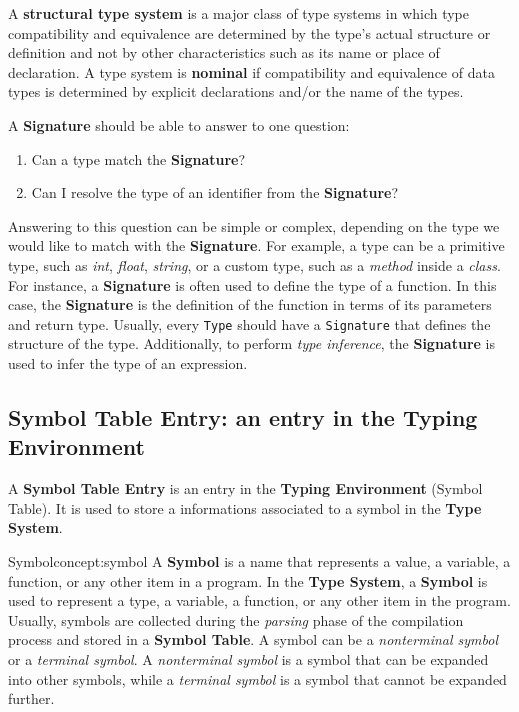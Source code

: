 A \textbf{structural type system} is a major class of type systems in which type compatibility and equivalence are determined by the type's actual structure or definition and not by other characteristics such as its name or place of declaration. A type system is \textbf{nominal} if compatibility and equivalence of data types is determined by explicit declarations and/or the name of the types.

A \textbf{Signature} should be able to answer to one question:

\begin{enumerate}
    \item Can a type match the \textbf{Signature}?
    \item Can I resolve the type of an identifier from the \textbf{Signature}?
\end{enumerate}

Answering to this question can be simple or complex, depending on the type we would like to match with the \textbf{Signature}. For example, a type can be a primitive type, such as \textit{int}, \textit{float}, \textit{string}, or a custom type, such as a \textit{method} inside a \textit{class}.
For instance, a \textbf{Signature} is often used to define the type of a function. In this case, the \textbf{Signature} is the definition of the function in terms of its parameters and return type.
Usually, every \texttt{Type} should have a \texttt{Signature} that defines the structure of the type.
Additionally, to perform \textit{type inference}, the \textbf{Signature} is used to infer the type of an expression.

\subsection{Symbol Table Entry: an entry in the Typing Environment}\label{subsec:concept:SymbolTableEntryAnEntryInTheTypingEnvironment}

A \textbf{Symbol Table Entry} is an entry in the \textbf{Typing Environment} (Symbol Table). It is used to store a informations associated to a symbol in the \textbf{Type System}.

\begin{mydefinition}{Symbol}{concept:symbol}
    A \textbf{Symbol} is a name that represents a value, a variable, a function, or any other item in a program. In the \textbf{Type System}, a \textbf{Symbol} is used to represent a type, a variable, a function, or any other item in the program.
    Usually, symbols are collected during the \textit{parsing} phase of the compilation process and stored in a \textbf{Symbol Table}.
    A symbol can be a \textit{nonterminal symbol} or a \textit{terminal symbol}. A \textit{nonterminal symbol} is a symbol that can be expanded into other symbols, while a \textit{terminal symbol} is a symbol that cannot be expanded further.
\end{mydefinition}


